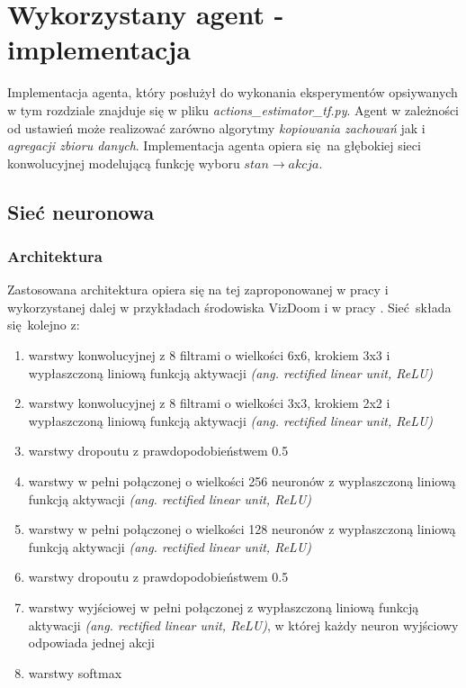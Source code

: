 \section{Wykorzystany agent - implementacja}

Implementacja agenta, który posłużył do wykonania eksperymentów opsiywanych w tym rozdziale znajduje się w pliku \textit{actions\_estimator\_tf.py}. Agent w zależności od ustawień może realizować zarówno algorytmy \textit{kopiowania zachowań} jak i \textit{agregacji zbioru danych}. Implementacja agenta opiera się na głębokiej sieci konwolucyjnej modelującą funkcję wyboru $stan \rightarrow akcja$.


\subsection{Sieć neuronowa}

\subsubsection{Architektura}
Zastosowana architektura opiera się na tej zaproponowanej w pracy \cite{mnih2015human} i wykorzystanej dalej w przykładach środowiska VizDoom i w pracy \cite{DBLP:journals/corr/KempkaWRTJ16}. Sieć składa się kolejno z:

\begin{enumerate}
\item{warstwy konwolucyjnej z 8 filtrami o wielkości 6x6, krokiem 3x3 i wypłaszczoną liniową funkcją aktywacji \textit{(ang. rectified linear unit, ReLU)}}
\item{warstwy konwolucyjnej z 8 filtrami o wielkości 3x3, krokiem 2x2 i wypłaszczoną liniową funkcją aktywacji \textit{(ang. rectified linear unit, ReLU)}}
\item{warstwy dropoutu z prawdopodobieństwem 0.5}
\item{warstwy w pełni połączonej o wielkości 256 neuronów z wypłaszczoną liniową funkcją aktywacji \textit{(ang. rectified linear unit, ReLU)}}
\item{warstwy w pełni połączonej o wielkości 128 neuronów z wypłaszczoną liniową funkcją aktywacji \textit{(ang. rectified linear unit, ReLU)}}
\item{warstwy dropoutu z prawdopodobieństwem 0.5}
\item{warstwy wyjściowej w pełni połączonej z wypłaszczoną liniową funkcją aktywacji \textit{(ang. rectified linear unit, ReLU)}, w której każdy neuron wyjściowy odpowiada jednej akcji}
\item{warstwy softmax}
\end{enumerate}

